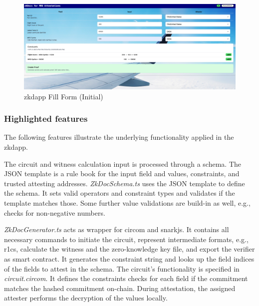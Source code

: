 \begin{figure}[hbt]
	\centering
		\includegraphics[width=1.0\textwidth]{Pictures/form.png}
	\caption{\acrshort{zkdapp} Fill Form (Initial)}
	\label{fig:form}
\end{figure}

\subsubsection{Highlighted features}
The following features illustrate the underlying functionality applied in the \acrshort{zkdapp}.


The circuit and witness calculation input is processed through a schema. The JSON template is a rule book for the input field and values, constraints, and trusted attesting addresses. \textit{ZkDocSchema.ts} uses the JSON template to define the schema. It sets valid operators and constraint types and validates if the template matches those. Some further value validations are build-in as well, e.g., checks for non-negative numbers. 

\textit{ZkDocGenerator.ts} acts as wrapper for circom and snarkjs. It contains all necessary commands to initiate the circuit, represent intermediate formats, e.g., \acrshort{r1cs}, calculate the witness and the zero-knowledge key file, and export the verifier as smart contract. It generates the constraint string and looks up the field indices of the fields to attest in the schema. The circuit's functionality is specified in \textit{circuit.circom}. It defines the constraints checks for each field if the commitment matches the hashed commitment on-chain. During attestation, the assigned attester performs the decryption of the values locally.

